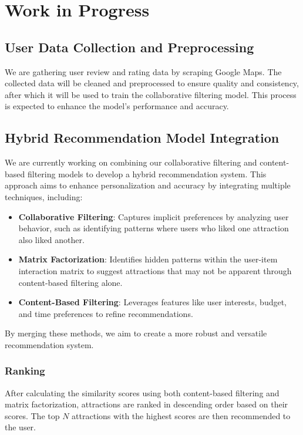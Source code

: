\chapter{Work in Progress}
\section{User Data Collection and Preprocessing}  
We are gathering user review and rating data by scraping Google Maps. The collected data will be cleaned and preprocessed to ensure quality and consistency, after which it will be used to train the collaborative filtering model. This process is expected to enhance the model's performance and accuracy.

\section{Hybrid Recommendation Model Integration}
We are currently working on combining our collaborative filtering and content-based filtering models to develop a hybrid recommendation system. This approach aims to enhance personalization and accuracy by integrating multiple techniques, including:

\begin{itemize}
    \item \textbf{Collaborative Filtering}: Captures implicit preferences by analyzing user behavior, such as identifying patterns where users who liked one attraction also liked another.
    \item \textbf{Matrix Factorization}: Identifies hidden patterns within the user-item interaction matrix to suggest attractions that may not be apparent through content-based filtering alone.
    \item \textbf{Content-Based Filtering}: Leverages features like user interests, budget, and time preferences to refine recommendations.
\end{itemize}

By merging these methods, we aim to create a more robust and versatile recommendation system.

\subsection{Ranking}
After calculating the similarity scores using both content-based filtering and matrix factorization, attractions are ranked in descending order based on their scores. The top $N$ attractions with the highest scores are then recommended to the user.

